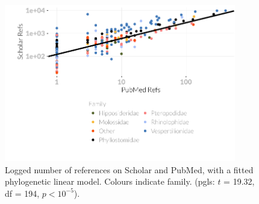 \begin{knitrout}\footnotesize
{}\color{fgcolor}\begin{figure}[t]

{\centering \includegraphics[width=0.9\textwidth]{figure/A-scholarvspubmedPlot-1} 

}

\caption[
  Logged number of references on Scholar and PubMed, with a fitted phylogenetic linear model]{
  Logged number of references on Scholar and PubMed, with a fitted phylogenetic linear model. 
  Colours indicate family. 
  (pgls: $t$ = 19.32, df = 194, $p < 10^{-5}$).}\label{fig:scholarvspubmedPlot}
\end{figure}


\end{knitrout}




























